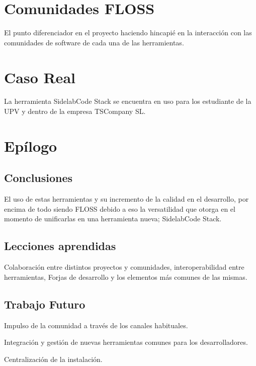 \documentclass[11pt]{scrartcl}
\begin{document}
\section{Comunidades FLOSS}
\label{sec:comunidades}

\par El punto diferenciador en el proyecto haciendo hincapi\'e en la interacci\'on con las comunidades de software de cada una de las herramientas.


\section{Caso Real}
\label{sec:casoreal}

\par La herramienta SidelabCode Stack se encuentra en uso para los estudiante de la UPV y dentro de la empresa TSCompany SL.


\section{Epílogo}
\label{sec:epílogo}

\subsection{Conclusiones}
\label{sub:conclusiones}

\par El uso de estas herramientas y su incremento de la calidad en el desarrollo, por encima de todo siendo FLOSS debido a eso la versatilidad que otorga en el momento de unificarlas en una herramienta nueva; SidelabCode Stack.


\subsection{Lecciones aprendidas}
\label{sub:lecciones}

\par Colaboraci\'on entre distintos proyectos y comunidades, interoperabilidad entre herramientas, Forjas de desarrollo y los elementos m\'as comunes de las mismas.

\subsection{Trabajo Futuro}
\label{sub:trabajofuturo}

\par Impulso de la comunidad a través de los canales habituales.

\par Integraci\'on y gesti\'on de nuevas herramientas comunes para los desarrolladores.

\par Centralizaci\'on de la instalaci\'on.

\end{document}
